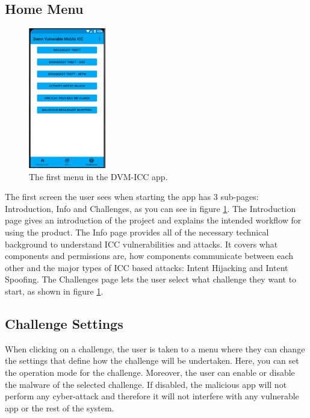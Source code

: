     \subsection{Home Menu}
        \label{subsec:home_menu}
        
    \begin{figure}
        \centering
        \includegraphics[width=0.3\textwidth]{graphics/home_activity.PNG}
        \caption{The first menu in the DVM-ICC app.}
        \label{fig:home_menu}
    \end{figure}
        
    The first screen the user sees when starting the app has 3 sub-pages: Introduction, Info and Challenges, as you can see in figure \ref{fig:home_menu}. The Introduction page gives an introduction of the project and explains the intended workflow for using the product. The Info page provides all of the necessary technical background to understand ICC vulnerabilities and attacks. It covers what components and permissions are, how components communicate between each other and the major types of ICC based attacks: Intent Hijacking and Intent Spoofing. The Challenges page lets the user select what challenge they want to start, as shown in figure \ref{fig:home_menu}.
    
    \subsection{Challenge Settings}
        \label{subsec:challenge_settings}
        
    When clicking on a challenge, the user is taken to a menu where they can change the settings that define how the challenge will be undertaken. Here, you can set the operation mode for the challenge. Moreover, the user can enable or disable the malware of the selected challenge. If disabled, the malicious app will not perform any cyber-attack and therefore it will not interfere with any vulnerable app or the rest of the system.
    

